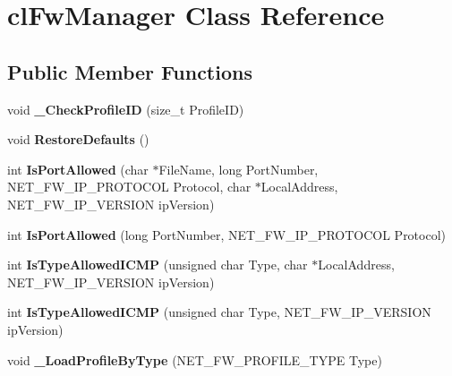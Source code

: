 \hypertarget{classcl_fw_manager}{
\section{clFwManager Class Reference}
\label{classcl_fw_manager}
}
\subsection*{Public Member Functions}
\begin{DoxyCompactItemize}
\item 
\hypertarget{classcl_fw_manager_a76e6d9e36ac12016a492337c0971f540}{
void {\bfseries \_\-CheckProfileID} (size\_\-t ProfileID)}
\label{classcl_fw_manager_a76e6d9e36ac12016a492337c0971f540}

\item 
\hypertarget{classcl_fw_manager_a8887c4676ce30f16653c3f05381e4a71}{
void {\bfseries RestoreDefaults} ()}
\label{classcl_fw_manager_a8887c4676ce30f16653c3f05381e4a71}

\item 
\hypertarget{classcl_fw_manager_a2b7aa8f9418032aa0e383e6737f05ad1}{
int {\bfseries IsPortAllowed} (char $\ast$FileName, long PortNumber, NET\_\-FW\_\-IP\_\-PROTOCOL Protocol, char $\ast$LocalAddress, NET\_\-FW\_\-IP\_\-VERSION ipVersion)}
\label{classcl_fw_manager_a2b7aa8f9418032aa0e383e6737f05ad1}

\item 
\hypertarget{classcl_fw_manager_a02369e798298bbc3d2948574f0798b8c}{
int {\bfseries IsPortAllowed} (long PortNumber, NET\_\-FW\_\-IP\_\-PROTOCOL Protocol)}
\label{classcl_fw_manager_a02369e798298bbc3d2948574f0798b8c}

\item 
\hypertarget{classcl_fw_manager_ac2b1a29c47fbe41dd7b634b1dc696ed6}{
int {\bfseries IsTypeAllowedICMP} (unsigned char Type, char $\ast$LocalAddress, NET\_\-FW\_\-IP\_\-VERSION ipVersion)}
\label{classcl_fw_manager_ac2b1a29c47fbe41dd7b634b1dc696ed6}

\item 
\hypertarget{classcl_fw_manager_a1bd2f93ef6302a3d3e70f05e23ab4ed1}{
int {\bfseries IsTypeAllowedICMP} (unsigned char Type, NET\_\-FW\_\-IP\_\-VERSION ipVersion)}
\label{classcl_fw_manager_a1bd2f93ef6302a3d3e70f05e23ab4ed1}

\item 
\hypertarget{classcl_fw_manager_ad7dfa0eb3ba57f37bf0cc265b72e7541}{
void {\bfseries \_\-LoadProfileByType} (NET\_\-FW\_\-PROFILE\_\-TYPE Type)}
\label{classcl_fw_manager_ad7dfa0eb3ba57f37bf0cc265b72e7541}

\end{DoxyCompactItemize}
